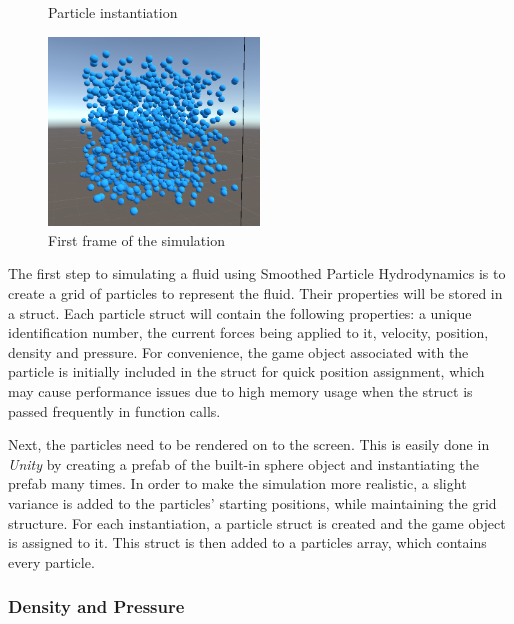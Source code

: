 \documentclass[12pt]{article}
\newcommand{\wideimage}[2][]{%
  \makebox[\textwidth][c]{\texttt{[image: \#2]}}%
}
\begin{document}
    \begin{figure}[H]
        \wideimage[]{spawnParticles.png}
        \caption{Particle instantiation}
    \end{figure}

    \begin{figure}[H]
        \begin{center}
            \includegraphics[width=0.5\textwidth]{firstFrameCPU.png}
            \caption{First frame of the simulation}
        \end{center}
    \end{figure}

    The first step to simulating a fluid using Smoothed Particle Hydrodynamics is to create a grid of particles to represent the fluid. Their properties will be stored in a struct. Each particle struct will contain the following properties: a unique identification number, the current forces being applied to it, velocity, position, density and pressure. For convenience, the game object associated with the particle is initially included in the struct for quick position assignment, which may cause performance issues due to high memory usage when the struct is passed frequently in function calls.
    
    Next, the particles need to be rendered on to the screen. This is easily done in \textit{Unity} by creating a prefab of the built-in sphere object and instantiating the prefab many times. In order to make the simulation more realistic, a slight variance is added to the particles' starting positions, while maintaining the grid structure. For each instantiation, a particle struct is created and the game object is assigned to it. This struct is then added to a particles array, which contains every particle.

    \subsubsection{Density and Pressure}
\end{document}
